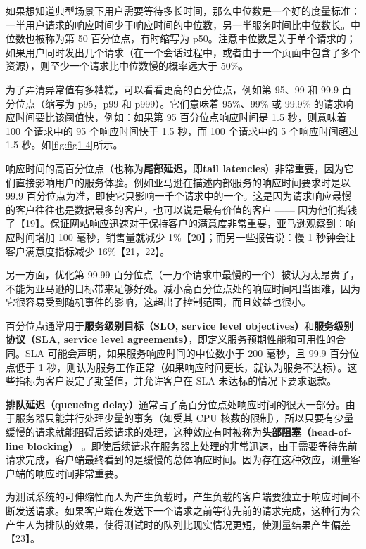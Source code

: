 如果想知道典型场景下用户需要等待多长时间，那么中位数是一个好的度量标准：一半用户请求的响应时间少于响应时间的中位数，另一半服务时间比中位数长。中位数也被称为第 50 百分位点，有时缩写为 p50。注意中位数是关于单个请求的；如果用户同时发出几个请求（在一个会话过程中，或者由于一个页面中包含了多个资源），则至少一个请求比中位数慢的概率远大于 50\%。

为了弄清异常值有多糟糕，可以看看更高的百分位点，例如第 95、99 和 99.9 百分位点（缩写为 p95，p99 和 p999）。它们意味着 95\%、99\% 或 99.9\% 的请求响应时间要比该阈值快，例如：如果第 95 百分位点响应时间是 1.5 秒，则意味着 100 个请求中的 95 个响应时间快于 1.5 秒，而 100 个请求中的 5 个响应时间超过 1.5 秒。如\autoref{fig:fig1-4}所示。

响应时间的高百分位点（也称为\textbf{尾部延迟}，即\textbf{tail latencies}）非常重要，因为它们直接影响用户的服务体验。例如亚马逊在描述内部服务的响应时间要求时是以 99.9 百分位点为准，即使它只影响一千个请求中的一个。这是因为请求响应最慢的客户往往也是数据最多的客户，也可以说是最有价值的客户 —— 因为他们掏钱了【19】。保证网站响应迅速对于保持客户的满意度非常重要，亚马逊观察到：响应时间增加 100 毫秒，销售量就减少 1\%【20】；而另一些报告说：慢 1 秒钟会让客户满意度指标减少 16\%【21，22】。

另一方面，优化第 99.99 百分位点（一万个请求中最慢的一个）被认为太昂贵了，不能为亚马逊的目标带来足够好处。减小高百分位点处的响应时间相当困难，因为它很容易受到随机事件的影响，这超出了控制范围，而且效益也很小。

百分位点通常用于\textbf{服务级别目标（SLO, service level objectives）}和\textbf{服务级别协议（SLA, service level agreements）}，即定义服务预期性能和可用性的合同。SLA 可能会声明，如果服务响应时间的中位数小于 200 毫秒，且 99.9 百分位点低于 1 秒，则认为服务工作正常（如果响应时间更长，就认为服务不达标）。这些指标为客户设定了期望值，并允许客户在 SLA 未达标的情况下要求退款。

\textbf{排队延迟（queueing delay）}通常占了高百分位点处响应时间的很大一部分。由于服务器只能并行处理少量的事务（如受其 CPU 核数的限制），所以只要有少量缓慢的请求就能阻碍后续请求的处理，这种效应有时被称为\textbf{头部阻塞（head-of-line blocking）} 。即使后续请求在服务器上处理的非常迅速，由于需要等待先前请求完成，客户端最终看到的是缓慢的总体响应时间。因为存在这种效应，测量客户端的响应时间非常重要。

为测试系统的可伸缩性而人为产生负载时，产生负载的客户端要独立于响应时间不断发送请求。如果客户端在发送下一个请求之前等待先前的请求完成，这种行为会产生人为排队的效果，使得测试时的队列比现实情况更短，使测量结果产生偏差【23】。

